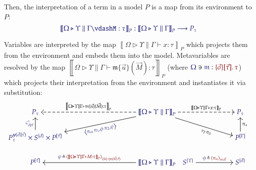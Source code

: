 \documentclass[11pt]{article}
\theoremstyle{definition}
\theoremstyle{remark}
\numberwithin{equation}{section}
\def\IModeColorName{MidnightBlue}
\def\OModeColorName{Maroon}
\newcommand\IMode[1]{{\color{\IModeColorName}{#1}}}
\newcommand\OMode[1]{{\color{\OModeColorName}{#1}}}
\newcommand\Of[2]{\IMode{#1}: \IMode{#2}}
\newcommand\MkValence[3]{%
  \ifthenelse{\equal{#1}{}}{}{%
    \{#1\}%
  }%
  \ifthenelse{\equal{#2}{}}{}{%
    [#2]%
  }.\, #3%
}
\newcommand\Lookup[3]{\IMode{#1}\ni\IMode{#2}:\OMode{#3}}
\newcommand\Tuple[1]{\left\langle#1 \right\rangle}
\newcommand\MV[1]{\mathfrak{#1}}
\newcommand\MApp[3]{#1\{#2\}(#3)}
\newcommand\Define[2]{\IMode{#1}\triangleq\OMode{#2}}
\newcommand\SemBrackets[1]{\left\llbracket#1\right\rrbracket}
\newcommand\Yoneda[1]{\boldsymbol{y} (#1)}
\begin{document}
Then, the interpretation of a term in a model $P$ is a map from its environment
to $P$:
\[%
  \Of{\SemBrackets{\Omega\triangleright\Upsilon\parallel\Gamma\vdash%
      M:\tau}_P}{\SemBrackets{\Omega\triangleright\Upsilon\parallel\Gamma}_P\longrightarrow P_\tau}%
\]

Variables are interpreted by the map
$\SemBrackets{\Omega\triangleright\Upsilon\parallel\Gamma\vdash x:\tau}_P$ which
projects them from the environment and embeds them into the model. Metavariables
are resolved by the map
$\SemBrackets{\Omega\triangleright\Upsilon\parallel\Gamma\vdash\MApp{\MV{m}}{\vec{u}}{\vec{M}}
  : \tau}_P$ (where
$\Lookup{\Omega}{\MV{m}}{\MkValence{\vec{\sigma}}{\vec{\tau}}{\tau}}$) which
projects their interpretation from the environment and instantiates it via
substitution:
\[
  \begin{tikzcd}[cramped, ampersand replacement = \&]
    {\IMode{P_\tau}}
    \&[8.0em] {\IMode{\SemBrackets{\Omega\triangleright\Upsilon\parallel\Gamma}_P}}
      \arrow[rr, dashed, "\SemBrackets{\Omega\triangleright\Upsilon\parallel\Gamma\vdash x:\tau}_P"]
      \ar{drr}[
        , rotate = -16.5
        , xshift = +1.5em
        , yshift = -0.2em
        , swap
      ]{{\nu}_{\Gamma} {\pi}_{3}}
      \ar{dl}[
        , rotate = +11.5
        , xshift = -2.75em
      ]{\IMode{\Tuple{\pi_\MV{m}\,\pi_1, \phi\,\pi_2, \psi}}}
      \arrow[l, dashed, swap, "\SemBrackets{\Omega\triangleright\Upsilon\parallel\Gamma\vdash\MApp{\MV{m}}{\vec{u}}{\vec{M}}: \tau}_P"]
    \&[-2.0em]
    \&[+3.0em]{\IMode{P_\tau}}
    \\
    {\IMode{P_{\tau}^{\Yoneda{\vec{\sigma}\parallel\vec{\tau}}}\times S^{\{\vec{\sigma}\}} \times P^{[\vec{\tau}]}}}
      \arrow[u, "\IMode{\varsigma^\tau_{\vec{\sigma}\parallel\vec{\tau}}}"]
    \&{}
    \&{}
    \& {\IMode{P^{[\Gamma]}}}
      \arrow[u, swap, "{\pi}_{x}"]
    \\
    {\IMode{P^{[\vec{\tau}]}}}
    \& {\IMode{\SemBrackets{\Omega\triangleright\Upsilon\parallel\Gamma}_P}}
      \arrow[l, swap, "\Define{\psi\,}{\,\Tuple{\SemBrackets{\Omega\triangleright\Upsilon\parallel\Gamma\vdash M:\tau}_P}_{(M,\tau)\in (\vec{M},\vec{\tau})}}"]
    \& {\IMode{S^{\{\Upsilon\}}}}
      \arrow[r, "\Define{\phi\,}{\,\Tuple{\pi_u}_{u\in\vec{u}}}"]
    \& {\IMode{S^{\{\vec{\sigma}\}}}}
  \end{tikzcd}
\]
\end{document}
